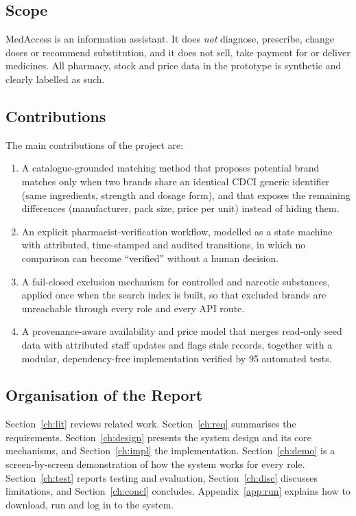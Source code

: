\documentclass[11pt,a4paper]{article}
\begin{document}
\subsection{Scope}
MedAccess is an information assistant. It does \emph{not} diagnose, prescribe, change doses or recommend substitution, and it does not sell, take payment for or deliver medicines. All pharmacy, stock and price data in the prototype is synthetic and clearly labelled as such.

\subsection{Contributions}
The main contributions of the project are:
\begin{enumerate}
\item A catalogue-grounded matching method that proposes potential brand matches only when two brands share an identical CDCI generic identifier (same ingredients, strength and dosage form), and that exposes the remaining differences (manufacturer, pack size, price per unit) instead of hiding them.
\item An explicit pharmacist-verification workflow, modelled as a state machine with attributed, time-stamped and audited transitions, in which no comparison can become ``verified'' without a human decision.
\item A fail-closed exclusion mechanism for controlled and narcotic substances, applied once when the search index is built, so that excluded brands are unreachable through every role and every API route.
\item A provenance-aware availability and price model that merges read-only seed data with attributed staff updates and flags stale records, together with a modular, dependency-free implementation verified by 95 automated tests.
\end{enumerate}

\subsection{Organisation of the Report}
Section~\ref{ch:lit} reviews related work. Section~\ref{ch:req} summarises the requirements. Section~\ref{ch:design} presents the system design and its core mechanisms, and Section~\ref{ch:impl} the implementation. Section~\ref{ch:demo} is a screen-by-screen demonstration of how the system works for every role. Section~\ref{ch:test} reports testing and evaluation, Section~\ref{ch:disc} discusses limitations, and Section~\ref{ch:concl} concludes. Appendix~\ref{app:run} explains how to download, run and log in to the system.
\end{document}
